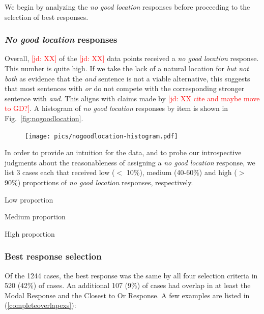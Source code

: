 \documentclass[11pt,letterpaper]{article}
\newcommand{\jd}[1]{\textcolor{Red}{[jd: #1]}}
\newcommand{\eref}[1]{(\ref{#1})}
\newcommand{\figref}[1]{Fig.~\ref{#1}}
\begin{document}
We begin by analyzing the \emph{no good location} responses before proceeding to the selection of best responses.

\subsubsection{\emph{No good location} responses}

Overall, \jd{XX} of the \jd{XX} data points received a \emph{no good location} response. This number is quite high. If we take the lack of a natural location for \emph{but not both} as evidence that the \emph{and} sentence is not a viable alternative, this suggests that most sentences with \emph{or} do not compete with the corresponding stronger sentence with \emph{and}. This aligns with claims made by \jd{XX cite and maybe move to GD?}. A histogram of \emph{no good location} responses by item is shown in \figref{fig:nogoodlocation}.

\begin{figure}
	\texttt{[image: pics/nogoodlocation-histogram.pdf]}
\end{figure}

In order to provide an intuition for the data, and to probe our introspective judgments about the reasonableness of assigning a \emph{no good location} response, we list 3 cases each that received low ($<$ 10\%), medium (40-60\%) and high ($>$ 90\%) proportions of \emph{no good location} responses, respectively.

\begin{exe}
	\ex Low proportion
	\begin{xlist}
		\ex
		\ex
		\ex
	\end{xlist}	
	\ex Medium proportion
	\begin{xlist}
		\ex
		\ex
		\ex
	\end{xlist}	
	\ex High proportion
	\begin{xlist}
		\ex
		\ex
		\ex
	\end{xlist}			
\end{exe}

\subsubsection{Best response selection}

Of the 1244 cases, the best response was the same by all four selection criteria in 520 (42\%) of cases. An additional 107 (9\%)  of cases  had overlap in at least the Modal Response and the Closest to Or Response. A few examples are listed in \eref{completeoverlapexs}:
\end{document}
